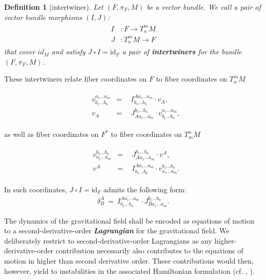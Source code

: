 \documentclass[%
 reprint,
nofootinbib,
 amsmath,amssymb,
 aps,
 prd,
floatfix,
]{revtex4-2}
\newtheorem{definition}{Definition}
\begin{document}
\begin{definition}[intertwiner]\label{interDef}
Let $(F,\pi_F,M)$ be a vector bundle. We call a pair of vector bundle morphisms $(I, J)$:
\begin{align}
    \begin{aligned}
    I&: F \longrightarrow T^m_n M\\
    J&: T^m_n M \longrightarrow F 
    \end{aligned}
\end{align}
that cover $id_M$ and satisfy
$J \circ I = \mathrm{id}_F$ a pair of \textbf{\textit{intertwiners}} for the bundle $(F, \pi_F, M)$.
\end{definition}

These intertwiners relate fiber coordinates on $F$ to fiber coordinates on $T^m_nM$

\begin{align} \label{interRel1}
    \begin{aligned}
    & v^{a_1 ... a_m}_{b_1 ... b_n} & = & \ \ I^{A a_1 ... a_m}_{b_1 ... b_n} \cdot v_{A},\\  
    & v_A & = & \ \ J^{b_1 ... b_n}_{A a_1 ... a_m} \cdot v^{a_1 ... a_m}_{b_1 ... b_n},
    \end{aligned}
\end{align}

as well as fiber coordinates on $F^\ast$ to fiber coordinates on $T^n_mM$

\begin{align} \label{interRel2}
    \begin{aligned}
    & v^{b_1 ... b_n}_{a_1 ... a_m} & = & \ \ J^{b_1 ... b_n}_{A a_1 ... a_m} \cdot v^{A},\\  
    & v^A & = & \ \  I^{A a_1 ... a_m}_{b_1 ... b_n} \cdot v^{b_1 ... b_n}_{a_1 ... a_m}.
    \end{aligned}
\end{align}

In such coordinates, $J\circ I = \mathrm{id}_F$ admits the following form:
\begin{align}
    \delta^A _ B \ = \ I^{A a_1 ... a_m}_{b_1 ... b_n} \cdot J^{b_1 ... b_n}_{B a_1 ... a_m}.  
\end{align}

The dynamics of the gravitational field shall be encoded as equations of motion to a second-derivative-order \textit{\textbf{Lagrangian}} for the gravitational field. We deliberately restrict to second-derivative-order Lagrangians as any higher-derivative-order contribution necessarily also contributes to the equations of motion in higher than second derivative order. These contributions would then, however, yield to instabilities in the associated Hamiltonian formulation (cf. \cite{Ostrogradsky:1850fid}, \cite{2015arXiv150602210W}). 
\end{document}
